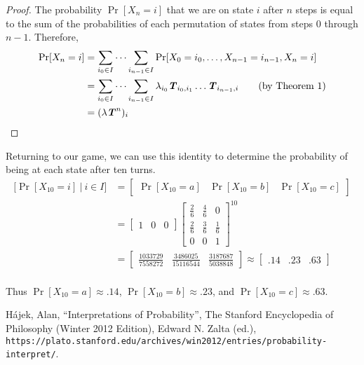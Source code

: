 \documentclass{article}
\newcommand{\T}{\textbf{\textit{T}}}
\theoremstyle{definition}
\theoremstyle{plain}
\begin{document}
\begin{proof}
The probability $\Pr[X_n = i]$ that we are on state $i$ after $n$ steps is equal to the sum of the probabilities of each permutation of states from steps $0$ through $n-1$. Therefore,
\begin{align*}
\Pr[X_n = i] &= \sum_{i_0 \in I} \dots \sum_{i_{n-1} \in I} \Pr[X_0 = i_0, \dots, X_{n-1} = i_{n-1}, X_n = i]\\
&= \sum_{i_0 \in I} \dots \sum_{i_{n-1} \in I} \lambda_{i_0}\T_{i_0, i_1}\dots\T_{i_{n-1}, i} \tag{by Theorem 1}\\
&= (\lambda \T^n)_i
\end{align*}
\end{proof}

	Returning to our game, we can use this identity to determine the probability of being at each state after ten turns.
	\begin{align*}
	\Big[\Pr[X_{10} = i] ~|~ i \in I\Big] &= 
	\begin{bmatrix}
	\Pr[X_{10} = a] & \Pr[X_{10} = b] & \Pr[X_{10} = c]
	\end{bmatrix}\\ &=
	\begin{bmatrix}
	1 & 0 & 0
	\end{bmatrix}
	\begin{bmatrix}
		\frac{2}{6} & \frac{4}{6} & 0           \\
		\frac{2}{6} & \frac{3}{6} & \frac{1}{6} \\
		0           & 0			  & 1
	\end{bmatrix}
	^{10}\\
	&=	
	\begin{bmatrix}
	\frac{1033729}{7558272} & \frac{3486025}{15116544} & \frac{3187687}{5038848}
	\end{bmatrix}
	\approx \begin{bmatrix}
	.14 & .23 & .63
	\end{bmatrix}
	\end{align*}
\\
Thus $\Pr[X_{10} = a] \approx .14$, $\Pr[X_{10} = b] \approx .23$, and $\Pr[X_{10} = c] \approx .63$.
	
	\begin{thebibliography}{9}
		H\'{a}jek, Alan, ``Interpretations of Probability'', The Stanford Encyclopedia of Philosophy (Winter 2012 Edition), Edward N. Zalta (ed.), \texttt{https://plato.stanford.edu/archives/win2012/entries/probability-interpret/}.
	\end{thebibliography}
\end{document}
